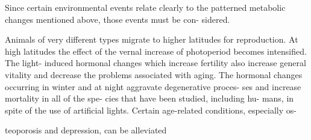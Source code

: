 \documentclass[10pt]{memoir}
\begin{document}
\begin{multicols}{2}
	\bigskip

	\noindent Since certain environmental events relate\linebreak
	clearly to the patterned metabolic changes\linebreak
	mentioned above, those events must be con-\linebreak
	sidered.

	\bigskip

	\noindent Animals of very different types migrate to\linebreak
	higher latitudes for reproduction. At high\linebreak
	latitudes the effect of the vernal increase\linebreak
	of photoperiod becomes intensified. The light-\linebreak
	induced hormonal changes which increase\linebreak
	fertility also increase general vitality and\linebreak
	decrease the problems associated with aging.\linebreak
	The hormonal changes occurring in winter\linebreak
	and at night aggravate degenerative proces-\linebreak
	ses and increase mortality in all of the spe-\linebreak
	cies that have been studied, including hu-\linebreak
	mans, in spite of the use of artificial lights.\linebreak
	Certain age-related conditions, especially os-\linebreak
	{teoporosis and depression, can be alleviated\parfillskip=0pt\par}

\end{multicols}

\newpage

\fancyhead[L]{}
\end{document}
